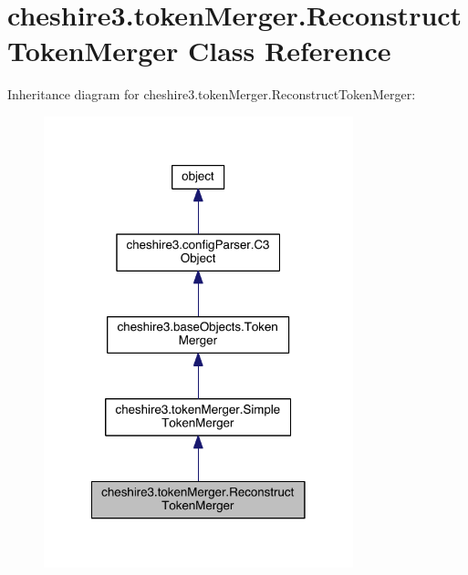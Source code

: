 \hypertarget{classcheshire3_1_1token_merger_1_1_reconstruct_token_merger}{\section{cheshire3.\-token\-Merger.\-Reconstruct\-Token\-Merger Class Reference}
\label{classcheshire3_1_1token_merger_1_1_reconstruct_token_merger}
}


Inheritance diagram for cheshire3.\-token\-Merger.\-Reconstruct\-Token\-Merger\-:
\nopagebreak
\begin{figure}[H]
\begin{center}
\leavevmode
\includegraphics[width=254pt]{classcheshire3_1_1token_merger_1_1_reconstruct_token_merger__inherit__graph}
\end{center}
\end{figure}


